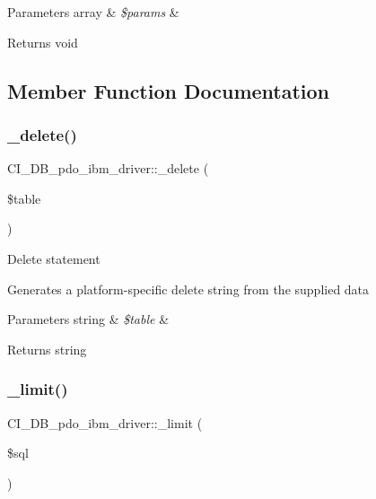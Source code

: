 \begin{DoxyParams}[1]{Parameters}
array & {\em \$params} & \\
\hline
\end{DoxyParams}
\begin{DoxyReturn}{Returns}
void 
\end{DoxyReturn}


\subsection{Member Function Documentation}
\mbox{\label{class_c_i___d_b__pdo__ibm__driver_a80ea4ca1cea0873bbf1ade9b9f9168de}} 
\subsubsection{\texorpdfstring{\+\_\+delete()}{\_delete()}}
{\footnotesize\ttfamily C\+I\+\_\+\+D\+B\+\_\+pdo\+\_\+ibm\+\_\+driver\+::\+\_\+delete (\begin{DoxyParamCaption}\item[{}]{\$table }\end{DoxyParamCaption})\hspace{0.3cm}{\ttfamily [protected]}}

Delete statement

Generates a platform-\/specific delete string from the supplied data


\begin{DoxyParams}[1]{Parameters}
string & {\em \$table} & \\
\hline
\end{DoxyParams}
\begin{DoxyReturn}{Returns}
string 
\end{DoxyReturn}
\mbox{\label{class_c_i___d_b__pdo__ibm__driver_a4601366fb27f00af8b0e2a18501b4f29}} 
\subsubsection{\texorpdfstring{\+\_\+limit()}{\_limit()}}
{\footnotesize\ttfamily C\+I\+\_\+\+D\+B\+\_\+pdo\+\_\+ibm\+\_\+driver\+::\+\_\+limit (\begin{DoxyParamCaption}\item[{}]{\$sql }\end{DoxyParamCaption})\hspace{0.3cm}{\ttfamily [protected]}}

